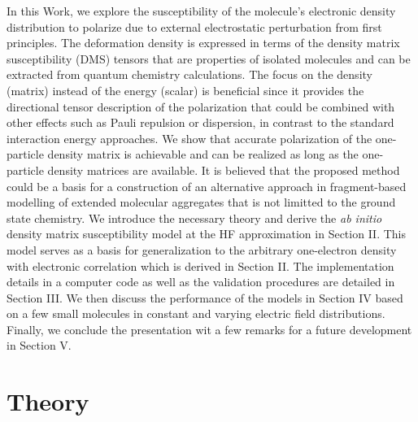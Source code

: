 \documentclass[aip,amsmath,amssymb,reprint]{revtex4-1}
\begin{document}
In this Work, we explore the susceptibility of the molecule's electronic density distribution
to polarize due to external electrostatic perturbation from first principles. 
The deformation density is expressed in terms
of the density matrix susceptibility (DMS) tensors that are properties of isolated molecules and can be
extracted from quantum chemistry calculations. The focus on the density (matrix) instead of the energy
(scalar) is beneficial since it provides the directional tensor description
of the polarization that could be combined with other effects such as Pauli repulsion or dispersion,
in contrast to the standard interaction energy approaches. We show that accurate polarization 
of the one\hyp{}particle density
matrix is achievable and can be realized as long as the one\hyp{}particle density matrices
are available. It is believed that the proposed method
could be a basis for a construction of an 
alternative approach in fragment\hyp{}based
modelling of extended molecular aggregates that is not limitted to the ground state chemistry.
We introduce the necessary theory and derive the \emph{ab initio} density matrix susceptibility model
at the HF approximation in Section II. This model serves as a basis for generalization to the 
arbitrary one\hyp{}electron density with electronic correlation which is derived in Section II. 
The implementation details in a computer code as well as the validation procedures are detailed
in Section III. We then discuss the performance of the models in Section IV based on a few small molecules
in constant and varying electric field distributions. Finally, we conclude the presentation wit a few 
remarks for a future development in Section V.

%

\section{\label{s:2}Theory}
\end{document}
